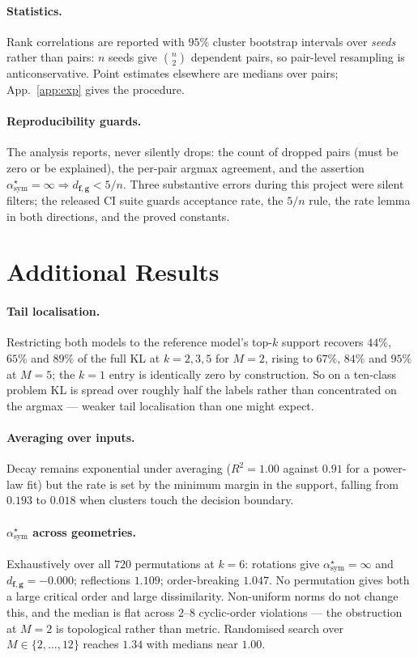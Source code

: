 \documentclass[10pt,letterpaper,twocolumn]{article}
\newcommand{\bff}{\mathbf{f}}
\newcommand{\bfg}{\mathbf{g}}
\newcommand{\dfg}{d_{\bff,\bfg}}
\theoremstyle{plain}
\theoremstyle{definition}
\theoremstyle{remark}
\begin{document}
\paragraph{Statistics.}
Rank correlations are reported with $95\%$ cluster bootstrap intervals over
\emph{seeds} rather than pairs: $n$ seeds give $\binom{n}{2}$ dependent pairs,
so pair-level resampling is anticonservative. Point estimates elsewhere are
medians over pairs; App.~\ref{app:exp} gives the procedure.

\paragraph{Reproducibility guards.}
The analysis reports, never silently drops: the count of dropped pairs (must be
zero or be explained), the per-pair argmax agreement, and the assertion
$\alpha^{\star}_{\mathrm{sym}}=\infty\Rightarrow\dfg<5/n$. Three substantive
errors during this project were silent filters; the released CI suite guards
acceptance rate, the $5/n$ rule, the rate lemma in both directions, and the
proved constants.

\section{Additional Results}
\label{app:extra}

\paragraph{Tail localisation.}
Restricting both models to the reference model's top-$k$ support recovers
$44\%$, $65\%$ and $89\%$ of the full KL at $k=2,3,5$ for $M{=}2$, rising to
$67\%$, $84\%$ and $95\%$ at $M{=}5$; the $k{=}1$ entry is identically zero by
construction. So on a ten-class problem KL is spread over roughly half the
labels rather than concentrated on the argmax --- weaker tail localisation than
one might expect.

\paragraph{Averaging over inputs.}
Decay remains exponential under averaging ($R^{2}=1.00$ against $0.91$ for a
power-law fit) but the rate is set by the minimum margin in the support,
falling from $0.193$ to $0.018$ when clusters touch the decision boundary.

\paragraph{$\alpha^{\star}_{\mathrm{sym}}$ across geometries.}
Exhaustively over all $720$ permutations at $k=6$: rotations give
$\alpha^{\star}_{\mathrm{sym}}=\infty$ and $\dfg=-0.000$; reflections $1.109$;
order-breaking $1.047$. No permutation gives both a large critical order and
large dissimilarity. Non-uniform norms do not change this, and the median is
flat across $2$--$8$ cyclic-order violations --- the obstruction at $M=2$ is
topological rather than metric. Randomised search over $M\in\{2,\dots,12\}$
reaches $1.34$ with medians near $1.00$.
\end{document}
